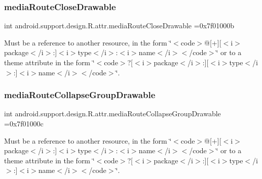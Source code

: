 \subsubsection{\texorpdfstring{media\+Route\+Close\+Drawable}{mediaRouteCloseDrawable}}
{\footnotesize\ttfamily int android.\+support.\+design.\+R.\+attr.\+media\+Route\+Close\+Drawable =0x7f01000b\hspace{0.3cm}{\ttfamily [static]}}

Must be a reference to another resource, in the form \char`\"{}$<$code$>$@\mbox{[}+\mbox{]}\mbox{[}$<$i$>$package$<$/i$>$\+:\mbox{]}$<$i$>$type$<$/i$>$\+:$<$i$>$name$<$/i$>$$<$/code$>$\char`\"{} or to a theme attribute in the form \char`\"{}$<$code$>$?\mbox{[}$<$i$>$package$<$/i$>$\+:\mbox{]}\mbox{[}$<$i$>$type$<$/i$>$\+:\mbox{]}$<$i$>$name$<$/i$>$$<$/code$>$\char`\"{}. \mbox{\label{classandroid_1_1support_1_1design_1_1R_1_1attr_ab3d21b3264b94bbf106793bfd53f18cf}} 
\subsubsection{\texorpdfstring{media\+Route\+Collapse\+Group\+Drawable}{mediaRouteCollapseGroupDrawable}}
{\footnotesize\ttfamily int android.\+support.\+design.\+R.\+attr.\+media\+Route\+Collapse\+Group\+Drawable =0x7f01000c\hspace{0.3cm}{\ttfamily [static]}}

Must be a reference to another resource, in the form \char`\"{}$<$code$>$@\mbox{[}+\mbox{]}\mbox{[}$<$i$>$package$<$/i$>$\+:\mbox{]}$<$i$>$type$<$/i$>$\+:$<$i$>$name$<$/i$>$$<$/code$>$\char`\"{} or to a theme attribute in the form \char`\"{}$<$code$>$?\mbox{[}$<$i$>$package$<$/i$>$\+:\mbox{]}\mbox{[}$<$i$>$type$<$/i$>$\+:\mbox{]}$<$i$>$name$<$/i$>$$<$/code$>$\char`\"{}. \mbox{\label{classandroid_1_1support_1_1design_1_1R_1_1attr_adfb066d0e9b0c709f5c7df7134cf445e}} 
